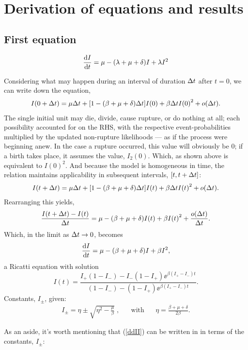 \section{Derivation of equations and results}


\subsection{First equation}


{\large$$\displaystyle\frac{{\rm d} I}{{\rm d} t} = \mu - (\lambda + \mu + \delta) I + \lambda I^2$$}



Considering what may happen during an interval of duration $\Delta t$ after $t=0$, we can write down the equation,
$$I(0+\Delta t) = \mu \Delta t + [1 - (\beta + \mu + \delta)\Delta t] I(0) + \beta\Delta t {I(0)}^2 + o(\Delta t). $$
The single initial unit may die, divide, cause rupture, or do nothing at all; each possibility accounted for on the RHS, with the respective event-probabilities multiplied by the updated non-rupture likelihoods --- as if the process were beginning anew. In the case a rupture occurred, this value will obviously be 0; if a birth takes place, it assumes the value, $I_2(0)$. Which, as shown above is equivalent to ${I(0)}^2$. And because the model is homogeneous in time, the relation maintains applicability in subsequent intervals, $[t, t+\Delta t]$:
$$I(t+\Delta t) = \mu \Delta t + [1 - (\beta + \mu + \delta)\Delta t] I(t) + \beta\Delta t {I(t)}^2 + o(\Delta t). $$
Rearranging this yields, 
$$\frac{I(t+\Delta t) -I(t)}{\Delta t} = \mu - (\beta + \mu + \delta) I(t) + \beta {I(t)}^2 + \frac{o(\Delta t)}{\Delta t}.$$
Which, in the limit as $\Delta t\to 0$, becomes
\begin{equation}
\label{ddII}
\displaystyle\frac{{\rm d} I}{{\rm d} t} = \mu - (\beta + \mu + \delta) I + \beta {I}^2,
\end{equation}
a Ricatti equation with solution
\begin{equation}
\label{formI}
I(t) = \frac{I_+(1-I_-) - I_-(1-I_+) \ee^{\beta(I_+ - I_-)t}}{(1-I_-) - (1-I_+) \ee^{\beta(I_+ - I_-)t}}.
\end{equation}
Constants, $I_{\pm}$, given:
\begin{align*}
I_{\pm} = \eta \pm \sqrt{\eta^2 - \frac{\mu}{\beta}}\;, \hspace{20pt} \text{with}\hspace{20pt} \eta = \frac{\beta + \mu + \delta}{2\beta}.
\end{align*}

As an aside, it's worth mentioning that (\ref{ddII}) can be written in in terms of the constants, $I_{\pm}$:

